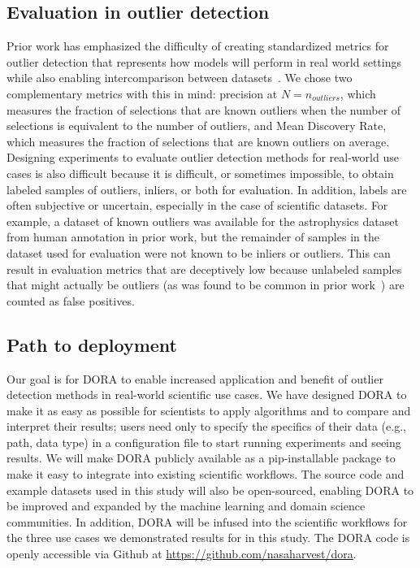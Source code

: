 \documentclass[utf8]{frontiersFPHY} %
\begin{document}
\subsection{Evaluation in outlier detection} 
Prior work has emphasized
the difficulty of creating standardized metrics for outlier detection that 
represents how models will perform in real world settings while also enabling
intercomparison between datasets~\cite{campos2016evaluation}. We chose two
complementary metrics with this in mind: precision at $N=n_{outliers}$, which
measures the fraction of selections that are known outliers when the number of
selections is equivalent to the number of outliers, and
Mean Discovery Rate, which measures the fraction of selections that are known 
outliers on average. 
Designing experiments to evaluate outlier detection methods for real-world
use cases is also difficult because it is difficult, or sometimes impossible, 
to obtain labeled samples of outliers, inliers, or both for evaluation. 
In addition, labels are often subjective or uncertain, 
especially in the case of scientific datasets. For example, a dataset of known
outliers was available for the astrophysics dataset from human annotation
in prior work, but the remainder of samples in the dataset used for evaluation
were not known to be inliers or outliers. This can result in evaluation metrics
that are deceptively low because unlabeled samples that might actually be
outliers (as was found to be common in prior work~\cite{wagstaff:des-anom20})
are counted as false positives. 

\subsection{Path to deployment} 
Our goal is for DORA to enable increased application and benefit of
outlier detection methods in real-world scientific use cases. We have 
designed DORA to make it as easy as possible for scientists to apply
algorithms and to compare and interpret their results; users need only
to specify the specifics of their data (e.g., path, data type) in a 
configuration file to start running experiments and seeing results. We will
make DORA publicly available as a pip-installable package to make it
easy to integrate into existing scientific workflows. 
The source code and example datasets used in this study will also be 
open-sourced, enabling DORA to be improved and expanded by the 
machine learning and domain science communities. 
In addition, DORA will be infused into the scientific workflows for the
three use cases we demonstrated results for in this study.
The DORA code is openly accessible via Github at
\url{https://github.com/nasaharvest/dora}.
\end{document}
